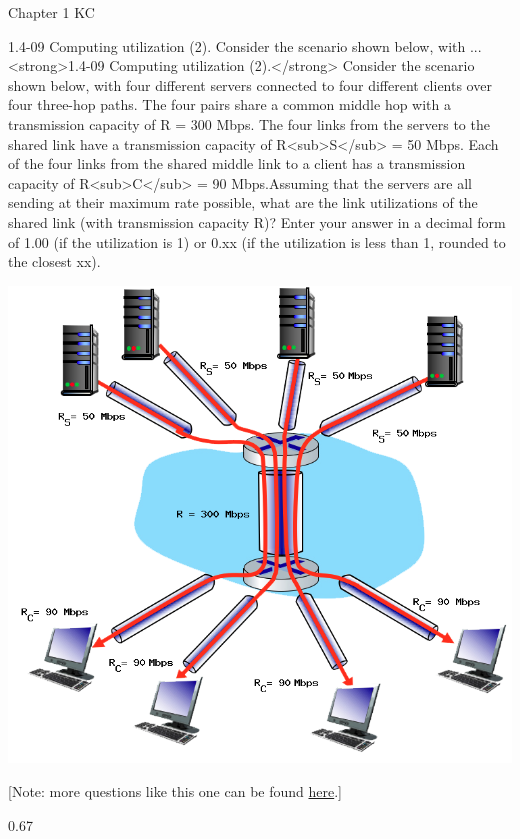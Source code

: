 \documentclass[a4paper]{article}
\begin{document}
\begin{quiz}{Chapter 1 KC}
\begin{shortanswer}[points=1]{1.4-09 Computing utilization (2). Consider the scenario shown below, with ...}
<strong>1.4-09 Computing utilization (2).</strong> Consider the scenario shown below, with four different servers connected to four different clients over four three-hop paths. The four pairs share a common middle hop with a transmission capacity of R = 300 Mbps. The four links from the servers to the shared link have a transmission capacity of R<sub>S</sub> = 50 Mbps. Each of the four links from the shared middle link to a client has a transmission capacity of R<sub>C</sub> = 90 Mbps.Assuming that the servers are all sending at their maximum rate possible, what are the link utilizations of the shared link (with transmission capacity R)? Enter your answer in a decimal form of 1.00 (if the utilization is 1) or 0.xx (if the utilization is less than 1, rounded to the closest xx). 
\begin{center}
\includegraphics[width=\linewidth]{figs/1.4.7.png}
\end{center}
 [Note: more questions like this one can be found \href{http://gaia.cs.umass.edu/kurose_ross/interactive/end-end-throughput-simple.php}{here}.]
\item* 0.67
\item *
\end{shortanswer}


\end{quiz}
\end{document}
